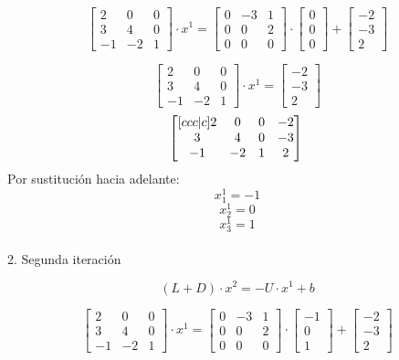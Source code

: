 \documentclass{article}
\begin{document}
\[ 
\begin{bmatrix}
2 & 0 & 0 \\
3 & 4 & 0 \\
-1 & -2 & 1 
\end{bmatrix} \cdot x^{1} = 
\begin{bmatrix}
0 & -3 & 1 \\
0 & 0 & 2 \\
0 & 0 & 0 
\end{bmatrix}
\cdot
\begin{bmatrix}
    0 \\ 0 \\ 0
\end{bmatrix}
+
\begin{bmatrix}
    -2 \\ -3 \\ 2
\end{bmatrix}
\]

\[ 
\begin{bmatrix}
2 & 0 & 0 \\
3 & 4 & 0 \\
-1 & -2 & 1 
\end{bmatrix} \cdot x^{1} = 
\begin{bmatrix}
    -2 \\ -3 \\ 2
\end{bmatrix}
\]
\[ 
\begin{bmatrix}[ccc|c]
2 & 0 & 0 & -2 \\
3 & 4 & 0 & -3 \\
-1 & -2 & 1 & 2 
\end{bmatrix}\\
\]
Por sustitución hacia adelante:
\[
x_1^1 = -1
\]
\[
x_2^1 = 0
\]
\[
x_3^1 = 1
\]\\

2. Segunda iteración

\[
(L + D) \cdot x^{2} = -U \cdot x^1 + b
\] 

\[ 
\begin{bmatrix}
2 & 0 & 0 \\
3 & 4 & 0 \\
-1 & -2 & 1 
\end{bmatrix} \cdot x^{1} = 
\begin{bmatrix}
0 & -3 & 1 \\
0 & 0 & 2 \\
0 & 0 & 0 
\end{bmatrix}
\cdot
\begin{bmatrix}
    -1 \\ 0 \\ 1
\end{bmatrix}
+
\begin{bmatrix}
    -2 \\ -3 \\ 2
\end{bmatrix}
\]
\end{document}
